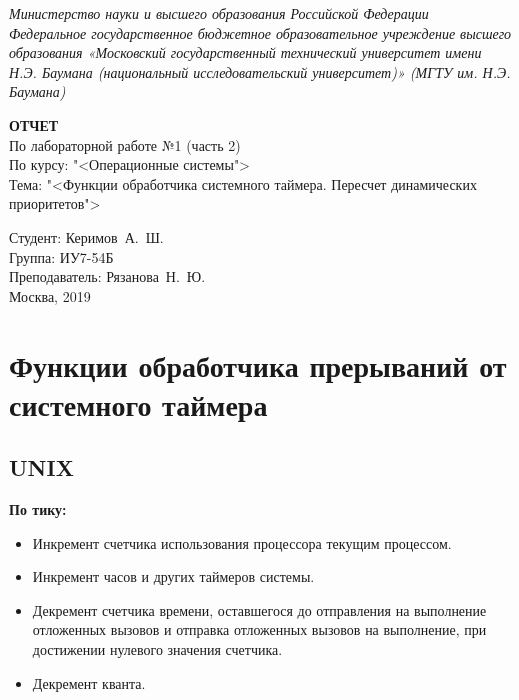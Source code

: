 \documentclass[a4paper,oneside,14pt]{extreport}
\begin{document}
\begin{titlepage}
	\centering
	
	{\footnotesize \itshape Министерство науки и высшего образования Российской Федерации\\
Федеральное государственное бюджетное образовательное учреждение 
высшего образования
«Московский государственный технический университет
имени Н.Э. Баумана
(национальный исследовательский университет)»
(МГТУ им. Н.Э. Баумана)\\}
	
	\vspace{60mm}
	
	\textbf{ОТЧЕТ}\\
	По лабораторной работе №1 (часть 2)\\
	По курсу: "<Операционные системы">\\
	Тема: "<Функции обработчика системного таймера. Пересчет динамических приоритетов">\\
	
	\vspace{60mm}
	
	\hspace{70mm} Студент:
	\hfill Керимов~А.~Ш.\\
	\hspace{70mm} Группа:
	\hfill ИУ7-54Б\\
	\hspace{70mm} Преподаватель:
	\hfill Рязанова~Н.~Ю.\\

	\vfill
	Москва, 2019
\end{titlepage}

\chapter{Функции обработчика прерываний от системного таймера}

\section{UNIX}

\textbf{По тику:}
\begin{itemize}
	\item Инкремент счетчика использования процессора текущим процессом.
	\item Инкремент часов и других таймеров системы.
	\item Декремент счетчика времени, оставшегося до отправления на выполнение отложенных вызовов и отправка отложенных вызовов на выполнение, при достижении нулевого значения счетчика.
	\item Декремент кванта.
\end{itemize}
\end{document}

